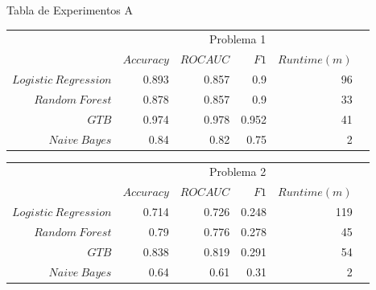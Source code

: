 \documentclass[xcolor=x11names]{beamer}
\newcommand{\ra}[1]{\renewcommand{\arraystretch}{#1}}
\begin{document}
\begin{frame}{Tabla de Experimentos A}

	\begin{table}[htp]\centering
	\footnotesize
		\ra{1.3}
		\begin{tabular}{@{}rr@{\hskip 0.3cm}r@{\hskip 0.3cm}r@{\hskip 0.3cm}rc@{}} \toprule
			&  \multicolumn{4}{c}{Problema 1} \\
			\cmidrule{2-5}
			& $Accuracy$ & $ROC AUC$ & $F1$ & $Runtime  (m)$ \\ \midrule
			$Logistic \ Regression$     & 0.893 & 0.857 & 0.9   & 96\\
			$Random \ Forest$            & 0.878 & 0.857 & 0.9  & 33 \\
			$GTB$ & 0.974 & 0.978 & 0.952 & 41  \\
			$Naive \ Bayes$               & 0.84  & 0.82  & 0.75  & 2  \\

			\bottomrule
		\end{tabular}


		\ra{1.3}
		\begin{tabular}{@{}rr@{\hskip 0.3cm}r@{\hskip 0.3cm}r@{\hskip 0.3cm}rc@{}} \toprule
			&  \multicolumn{4}{c}{Problema 2} \\
			\cmidrule{2-5}
			& $Accuracy$ & $ROC AUC$ & $F1$ & $Runtime  (m)$ \\ \midrule
			$Logistic \ Regression$     & 0.714 & 0.726 & 0.248 & 119 \\
			$Random \ Forest$            & 0.79  & 0.776 & 0.278 & 45  \\
			$GTB$ & 0.838 & 0.819 & 0.291 & 54 \\
			$Naive \ Bayes$               & 0.64  & 0.61  & 0.31  & 2   \\

			\bottomrule
		\end{tabular}
	\end{table}

\end{frame}
\end{document}
